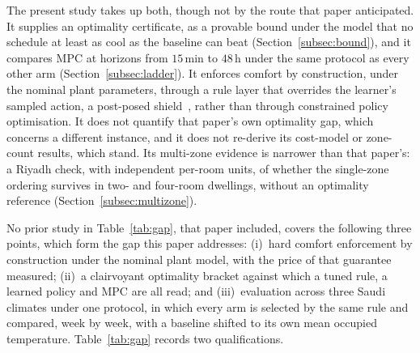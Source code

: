 \documentclass[3p,twocolumn,number]{elsarticle}
\begin{document}
The present study takes up both, though not by the route that paper anticipated. It supplies an optimality certificate, as a provable bound under the model that no schedule at least as cool as the baseline can beat (Section~\ref{subsec:bound}), and it compares MPC at horizons from $15\,$min to $48\,$h under the same protocol as every other arm (Section~\ref{subsec:ladder}). It enforces comfort by construction, under the nominal plant parameters, through a rule layer that overrides the learner's sampled action, a post-posed shield~\cite{Alshiekh2018}, rather than through constrained policy optimisation. It does not quantify that paper's own optimality gap, which concerns a different instance, and it does not re-derive its cost-model or zone-count results, which stand. Its multi-zone evidence is narrower than that paper's: a Riyadh check, with independent per-room units, of whether the single-zone ordering survives in two- and four-room dwellings, without an optimality reference (Section~\ref{subsec:multizone}).

No prior study in Table~\ref{tab:gap}, that paper included, covers the following three points, which form the gap this paper addresses: (i)~hard comfort enforcement by construction under the nominal plant model, with the price of that guarantee measured; (ii)~a clairvoyant optimality bracket against which a tuned rule, a learned policy and MPC are all read; and (iii)~evaluation across three Saudi climates under one protocol, in which every arm is selected by the same rule and compared, week by week, with a baseline shifted to its own mean occupied temperature. Table~\ref{tab:gap} records two qualifications.
 
\end{document}
